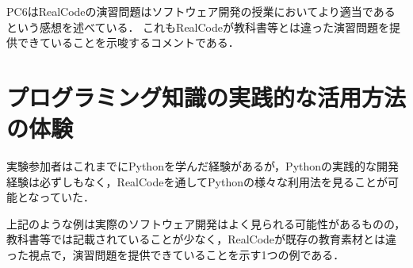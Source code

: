 PC6はRealCodeの演習問題はソフトウェア開発の授業においてより適当であるという感想を述べている．
これもRealCodeが教科書等とは違った演習問題を提供できていることを示唆するコメントである．



\section*{プログラミング知識の実践的な活用方法の体験}

実験参加者はこれまでにPythonを学んだ経験があるが，Pythonの実践的な開発経験は必ずしもなく，RealCodeを通してPythonの様々な利用法を見ることが可能となっていた．




上記のような例は実際のソフトウェア開発はよく見られる可能性があるものの，教科書等では記載されていることが少なく，RealCodeが既存の教育素材とは違った視点で，演習問題を提供できていることを示す1つの例である．

